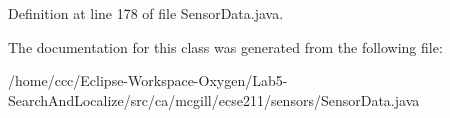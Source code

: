 Definition at line 178 of file Sensor\+Data.\+java.



The documentation for this class was generated from the following file\+:\begin{DoxyCompactItemize}
\item 
/home/ccc/\+Eclipse-\/\+Workspace-\/\+Oxygen/\+Lab5-\/\+Search\+And\+Localize/src/ca/mcgill/ecse211/sensors/Sensor\+Data.\+java\end{DoxyCompactItemize}
